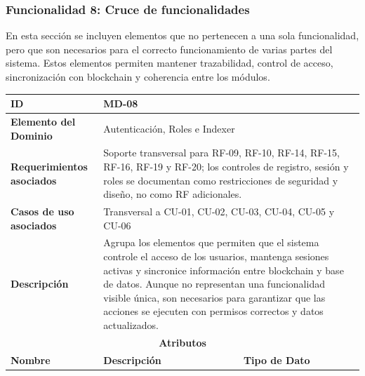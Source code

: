 \documentclass[12pt,letterpaper]{article}
\begin{document}
\subsubsection{Funcionalidad 8: Cruce de funcionalidades}
En esta sección se incluyen elementos que no pertenecen a una sola funcionalidad, pero que son necesarios para el correcto funcionamiento de varias partes del sistema. Estos elementos permiten mantener trazabilidad, control de acceso, sincronización con blockchain y coherencia entre los módulos.
\begin{table}[H]
\centering
\scriptsize
\renewcommand{\arraystretch}{1.12}
\setlength{\tabcolsep}{4pt}

\begin{tabularx}{\textwidth}{|p{3.2cm}|X|p{3.8cm}|}
\hline
\textbf{ID} & MD-08 & \\ \hline

\textbf{Elemento del Dominio} & 
\multicolumn{2}{X|}{Autenticación, Roles e Indexer} \\ \hline

\textbf{Requerimientos asociados} & 
\multicolumn{2}{X|}{Soporte transversal para RF-09, RF-10, RF-14, RF-15, RF-16, RF-19 y RF-20; los controles de registro, sesión y roles se documentan como restricciones de seguridad y diseño, no como RF adicionales.} \\ \hline

\textbf{Casos de uso asociados} & 
\multicolumn{2}{X|}{Transversal a CU-01, CU-02, CU-03, CU-04, CU-05 y CU-06} \\ \hline

\textbf{Descripción} & 
\multicolumn{2}{X|}{Agrupa los elementos que permiten que el sistema controle el acceso de los usuarios, mantenga sesiones activas y sincronice información entre blockchain y base de datos. Aunque no representan una funcionalidad visible única, son necesarios para garantizar que las acciones se ejecuten con permisos correctos y datos actualizados.} \\ \hline

\multicolumn{3}{|c|}{\textbf{Atributos}} \\ \hline

\textbf{Nombre} & \textbf{Descripción} & \textbf{Tipo de Dato} \\ \hline


\end{tabularx}
\end{table}
\end{document}
